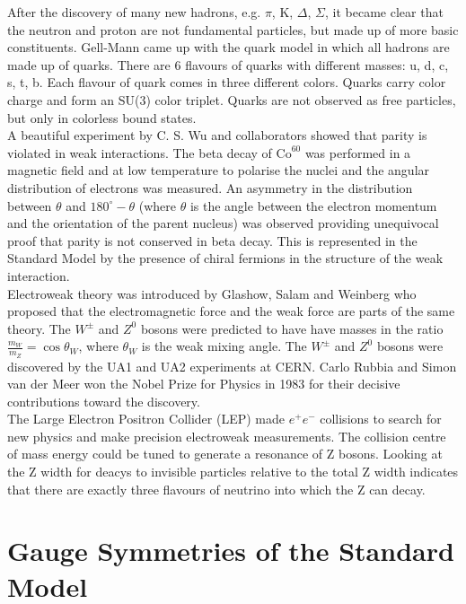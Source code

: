 After the discovery of many new hadrons, e.g. $\pi$, K, $\Delta$, $\Sigma$, it
became clear that the neutron and proton are not fundamental particles, but made
up of more basic constituents. Gell-Mann came up with the quark model in which 
all hadrons are made up of quarks. There are 6 flavours of quarks with different
masses: u, d, c, s, t, b. Each flavour of quark comes in three different colors.
Quarks carry color charge and form an SU(3) color triplet. Quarks are not 
observed as free particles, but only in colorless bound states. \\

A beautiful experiment by C. S. Wu and collaborators showed that parity is
violated in weak interactions. The beta decay of $\mbox{Co}^{60}$ was performed 
in a magnetic field and at low temperature to polarise the nuclei and the 
angular distribution of electrons was measured. An asymmetry in the distribution
between $\theta$ and $180^{\circ} - \theta$ (where $\theta$ is the angle between 
the electron momentum and the orientation of the parent nucleus) was observed
providing unequivocal proof that parity is not conserved in beta decay. This is
represented in the Standard Model by the presence of chiral fermions in the
structure of the weak interaction. \\

Electroweak theory was introduced by Glashow, Salam and Weinberg who proposed
that the electromagnetic force and the weak force are parts of the same theory. 
The $W^{\pm}$ and $Z^{0}$ bosons were predicted to have have masses in the ratio
$\frac{m_{W}}{m_{Z}} = \cos{\theta_{W}}$, where $\theta_{W}$ is the weak mixing 
angle. The $W^{\pm}$ and $Z^{0}$ bosons were discovered by the UA1 and 
UA2 experiments at CERN. Carlo Rubbia and Simon van der Meer won the Nobel Prize
for Physics in 1983 for their decisive contributions toward the discovery. \\

The Large Electron Positron Collider (LEP) made $e^{+}e^{-}$ collisions to
search for new physics and make precision electroweak measurements. The
collision centre of mass energy could be tuned to generate a resonance of Z
bosons. Looking at the Z width for deacys to invisible particles relative to the
total Z width indicates that there are exactly three flavours of neutrino into
which the Z can decay. 

\section{Gauge Symmetries of the Standard Model}

